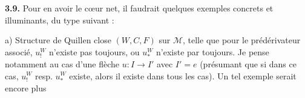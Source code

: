 \documentclass[11pt]{article}
\newcommand{\M}{\mathcal{M}}
\begin{document}
\textbf{3.9.} Pour en avoir le cœur net, il faudrait quelques exemples concrets et illuminants, du type suivant :

a) Structure de Quillen close $(W,C,F)$ sur $\M$, telle que pour le prédérivateur associé, $u^{W}_{!}$ n'existe pas toujours, ou $u^{W}_{*}$ n'existe par toujours. Je pense notamment au cas d'une flèche $u : I\longrightarrow I'$ avec $I'=e$ (présumant que si dans ce cas, $u^{W}_{!}$ resp. $u^{W}_{*}$ existe, alors il existe dans tous les cas). Un tel exemple serait encore plus %
\end{document}
